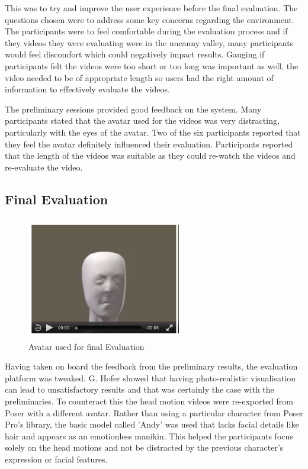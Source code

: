 \documentclass[bsc,frontabs,twoside,singlespacing,parskip,deptreport]{infthesis}
\begin{document}
This was to try and improve the user experience before the final evaluation. The questions chosen were to address some key concerns regarding the environment. The participants were to feel comfortable during the evaluation process and if they videos they were evaluating were in the uncanny valley, many participants would feel discomfort which could negatively impact results. Gauging if participants felt the videos were too short or too long was important as well, the video needed to be of appropriate length so users had the right amount of information to effectively evaluate the videos.

The preliminary sessions provided good feedback on the system. Many participants stated that the avatar used for the videos was very distracting, particularly with the eyes of the avatar. Two of the six participants reported that they feel the avatar definitely influenced their evaluation. Participants reported that the length of the videos was suitable as they could re-watch the videos and re-evaluate the video.

\subsection{Final Evaluation}

\begin{figure}
	\centering
	\includegraphics[width=0.6\textwidth]{eval_3.png}
	\caption{Avatar used for final Evaluation}
\end{figure}

Having taken on board the feedback from the preliminary results, the evaluation platform was tweaked. G. Hofer \cite{hofer_evaluation} showed that having photo-realistic visualisation can lead to unsatisfactory results and that was certainly the case with the preliminaries. To counteract this the head motion videos were re-exported from Poser with a different avatar. Rather than using a particular character from Poser Pro's library, the basic model called 'Andy' was used that lacks facial details like hair and appears as an emotionless manikin. This helped the participants focus solely on the head motions and not be distracted by the previous character's expression or facial features. 
\end{document}
